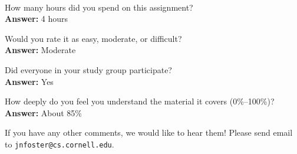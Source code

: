 \documentclass[10pt]{article}
\begin{document}
\begin{debriefing} \hfill\\[-4ex]
\begin{enumerate*}
\item How many hours did you spend on this assignment?\\[0.2cm]
\noindent \textbf{Answer:} 4 hours\\

\item Would you rate it as easy, moderate, or difficult?\\[0.2cm]
\noindent \textbf{Answer:} Moderate\\

\item Did everyone in your study group participate?\\[0.2cm]
\noindent \textbf{Answer:} Yes\\

\item How deeply do you feel you understand the material it covers (0\%--100\%)?\\[0.2cm]
\noindent \textbf{Answer:} About 85\% \\

\item If you have any other comments, we would like to hear them!
  Please send email to \texttt{jnfoster@cs.cornell.edu}.
\end{enumerate*}
\end{debriefing}
\end{document}
